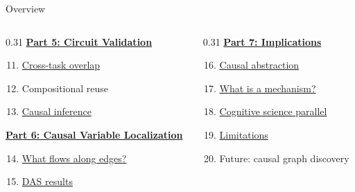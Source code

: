 \documentclass[10pt,aspectratio=169]{beamer}
\begin{document}
\begin{frame}{Overview}
\begin{columns}[T]
\begin{column}{0.31\textwidth}
\vspace{0.6em}
\textbf{\hyperlink{sl:validation}{Part 5: Circuit Validation}}
\begin{enumerate}\setcounter{enumi}{10}
  \item \hyperlink{sl:circuitoverlap}{Cross-task overlap}
  \item Compositional reuse
  \item \hyperlink{sl:causaldiscovery}{Causal inference}
\end{enumerate}

\vspace{0.6em}
\textbf{\hyperlink{sl:cvl}{Part 6: Causal Variable Localization}}
\begin{enumerate}\setcounter{enumi}{13}
  \item \hyperlink{sl:cvl}{What flows along edges?}
  \item \hyperlink{sl:dasresults}{DAS results}
\end{enumerate}
\end{column}

\begin{column}{0.31\textwidth}
\textbf{\hyperlink{sl:discussion}{Part 7: Implications}}
\begin{enumerate}\setcounter{enumi}{15}
  \item \hyperlink{sl:discussion}{Causal abstraction}
  \item \hyperlink{sl:mechanism}{What is a mechanism?}
  \item \hyperlink{sl:cogsci}{Cognitive science parallel}
  \item \hyperlink{sl:tooling}{Limitations}
  \item Future: causal graph discovery
\end{enumerate}
\end{column}
\end{columns}
\end{frame}

\begin{frame}
\begin{center}
\vfill
  {\setlength{\fboxrule}{2.5pt}}
\vfill
\end{center}
\end{frame}
\end{document}
